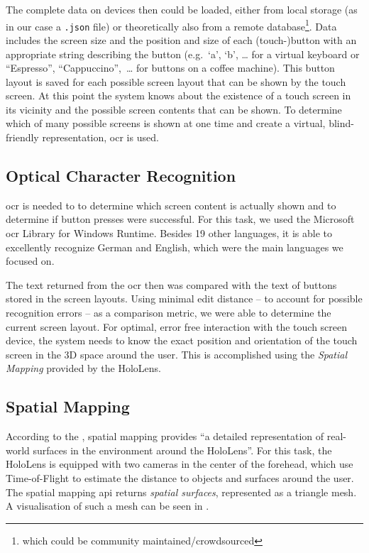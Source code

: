 The complete data on devices then could be loaded, either from local storage (as in  our case a \texttt{.json} file) or theoretically also from a remote database\footnote{which could be community maintained/crowdsourced}.
Data includes the screen size and the position and size of each (touch-)button with an appropriate string describing the button (e.g.\ \enquote*{a}, \enquote*{b}, \dots{} for a virtual keyboard or \enquote{Espresso}, \enquote{Cappuccino},~\dots{} for buttons on a coffee machine).
This button layout is saved for each possible screen layout that can be shown by the touch screen.
At this point  the system knows about the existence of a touch screen in its vicinity and the possible screen contents that can be shown.
To determine which of many possible screens is shown at one time and create a virtual, blind-friendly representation, \ac{ocr} is used.

\subsection{Optical Character Recognition}
\label{subsec:ocr}
\ac{ocr} is needed to  to determine which screen content is actually shown and to determine if button presses were successful.
For this task, we used the Microsoft \ac{ocr} Library for Windows Runtime.
Besides 19 other languages, it is able to excellently recognize German and English, which were the main languages we focused on.

The text returned from the \ac{ocr} then was compared with the text of buttons stored in the screen layouts. 
Using minimal edit distance  -- to account for possible recognition errors -- as a comparison metric, we were able to determine the current screen layout.
For optimal, error free interaction with the touch screen device, the system needs to know the exact position and orientation of the touch screen in the 3D space around the user.
This is accomplished using the \emph{Spatial Mapping} provided by the HoloLens.

\subsection{Spatial Mapping}
\label{subsec:spatial}
According to the \textcite{spatialmapping}, spatial mapping provides \enquote{a detailed representation of real-world surfaces in the environment around the HoloLens}.
For this task, the HoloLens is equipped with two cameras in the center of the forehead, which use Time-of-Flight to estimate the distance to objects and surfaces around the user. 
The spatial mapping \ac{api} returns \emph{spatial surfaces}, represented as a triangle mesh.
A visualisation of such a mesh can be seen in .

